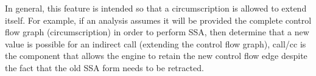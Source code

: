 In general, this feature is intended so that a circumscription is allowed to extend itself.
For example, if an analysis assumes it will be provided the complete control flow graph (circumscription) in order to perform SSA, then determine that a new value is possible for an indirect call (extending the control flow graph), call/cc is the component that allows the engine to retain the new control flow edge despite the fact that the old SSA form needs to be retracted.
